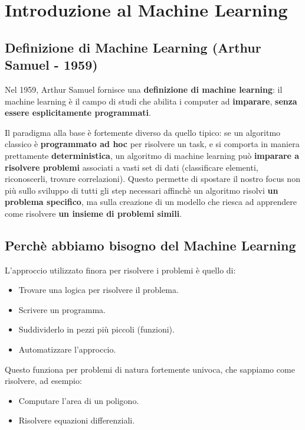 \chapter{Introduzione al Machine Learning}

\section{Definizione di Machine Learning (Arthur Samuel - 1959)}


Nel 1959, Arthur Samuel fornisce una \textbf{definizione di machine learning}: il machine learning è il campo di studi che abilita i computer ad \textbf{imparare}, \textbf{senza essere esplicitamente programmati}.

Il paradigma alla base è fortemente diverso da quello tipico: se un algoritmo classico è \textbf{programmato ad hoc }per risolvere un task, e si comporta in maniera prettamente \textbf{deterministica}, un algoritmo di machine learning può \textbf{imparare a risolvere problemi} associati a vasti set di dati (classificare elementi, riconoscerli, trovare correlazioni). Questo permette di spostare il nostro focus non più sullo sviluppo di tutti gli step necessari affinchè un algoritmo risolvi \textbf{un problema specifico}, ma sulla creazione di un modello che riesca ad apprendere come risolvere \textbf{un insieme di problemi simili}.

\section{Perchè abbiamo bisogno del Machine Learning}

L'approccio utilizzato finora per risolvere i problemi è quello di:

\begin{itemize}
\item Trovare una logica per risolvere il problema.
\item Scrivere un programma.
\item Suddividerlo in pezzi più piccoli (funzioni).
\item Automatizzare l'approccio.
\end{itemize}

Questo funziona per problemi di natura fortemente univoca, che sappiamo come risolvere, ad esempio:

\begin{itemize}
    \item Computare l'area di un poligono.
    \item Risolvere equazioni differenziali.
\end{itemize}


